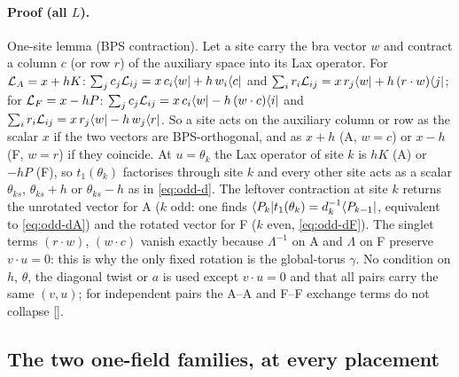 \paragraph{Proof (all $L$).} One-site lemma (BPS contraction). Let a site carry the bra vector $w$ and contract a column $c$ (or row $r$)
of the auxiliary space into its Lax operator. For $\mathcal L_A=x+hK$: $\sum_jc_j\mathcal L_{ij}=x\,c_i\langle w|+h\,w_i\langle c|$ and
$\sum_ir_i\mathcal L_{ij}=x\,r_j\langle w|+h\,(r\cdot w)\langle j|$; for $\mathcal L_F=x-hP$: $\sum_jc_j\mathcal L_{ij}=x\,c_i\langle w|-h\,(w\cdot c)\langle i|$ and
$\sum_ir_i\mathcal L_{ij}=x\,r_j\langle w|-h\,w_j\langle r|$. So a site acts on the auxiliary column or row as the scalar $x$ if the two vectors
are BPS-orthogonal, and as $x+h$ (A, $w=c$) or $x-h$ (F, $w=r$) if they coincide. At $u=\theta_k$ the Lax operator of site $k$ is
$hK$ (A) or $-hP$ (F), so $t_1(\theta_k)$ factorises through site $k$ and every other site acts as a scalar $\theta_{ks}$,
$\theta_{ks}+h$ or $\theta_{ks}-h$ as in \eqref{eq:odd-d}. The leftover contraction at site $k$ returns the unrotated
vector for A ($k$ odd: one finds $\langle P_k|t_1(\theta_k)=d_k^{-1}\langle P_{k-1}|$, equivalent to \eqref{eq:odd-dA}) and the rotated
vector for F ($k$ even, \eqref{eq:odd-dF}). The singlet terms $(r\cdot w)$,
$(w\cdot c)$ vanish exactly because $\Lambda^{-1}$ on A and $\Lambda$ on F preserve $v\cdot u=0$: this is why the only fixed rotation
is the global-torus $\gamma$. No condition on $h$, $\theta$, the diagonal twist or $a$ is used except $v\cdot u=0$ and that all pairs
carry the same $(v,u)$; for independent pairs the A--A and F--F exchange terms do not collapse [].

\subsection{The two one-field families, at every placement}\label{sec:odd-fam}

